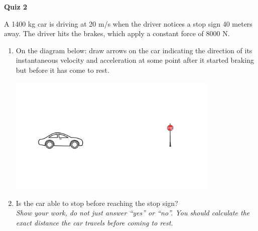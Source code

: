 \documentclass{article}
\begin{document}
\fancyfoot[C]{\thepage}
\vspace*{0cm}
\begin{center}
	{\LARGE \textbf{Quiz 2}}
\end{center}

A 1400 kg car is driving at 20 m/s when the driver notices a stop sign 40 meters away. The driver hits the brakes, which apply a constant force of 8000 N. 
\begin{enumerate}

\item On the diagram below: draw arrows on the car indicating the direction of its instantaneous velocity and acceleration at some point after it started braking but before it has come to rest.\\ 
\begin{center}
	\includegraphics[width=10cm]{stupid.pdf}
\end{center}
\item Is the car able to stop before reaching the stop sign?\\
\textit{Show your work, do not just answer ``yes'' or ``no''. You should calculate the exact distance the car travels before coming to rest.}
\end{enumerate}
\end{document}
